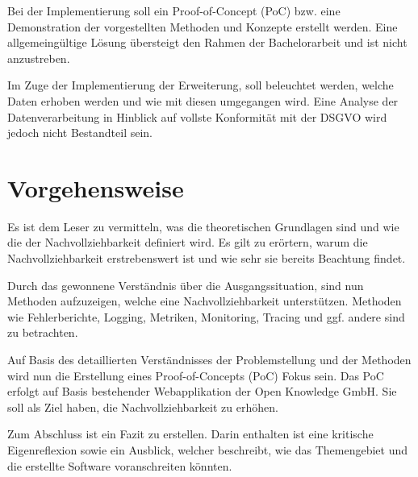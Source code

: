 Bei der Implementierung soll ein Proof-of-Concept (PoC) bzw. eine Demonstration der vorgestellten Methoden und Konzepte erstellt werden. Eine allgemeingültige Lösung übersteigt den Rahmen der Bachelorarbeit und ist nicht anzustreben.


Im Zuge der Implementierung der Erweiterung, soll beleuchtet werden, welche Daten erhoben werden und wie mit diesen umgegangen wird. Eine Analyse der Datenverarbeitung in Hinblick auf vollste Konformität mit der DSGVO wird jedoch nicht Bestandteil sein.

\pagebreak

\section{Vorgehensweise}

Es ist dem Leser zu vermitteln, was die theoretischen Grundlagen sind und wie die der Nachvollziehbarkeit definiert wird. Es gilt zu erörtern, warum die Nachvollziehbarkeit erstrebenswert ist und wie sehr sie bereits Beachtung findet.

Durch das gewonnene Verständnis über die Ausgangssituation, sind nun Methoden aufzuzeigen, welche eine Nachvollziehbarkeit unterstützen. Methoden wie Fehlerberichte, Logging, Metriken, Monitoring, Tracing und ggf. andere sind zu betrachten.

Auf Basis des detaillierten Verständnisses der Problemstellung und der Methoden wird nun die Erstellung eines Proof-of-Concepts (PoC) Fokus sein. Das PoC erfolgt auf Basis bestehender Webapplikation der Open Knowledge GmbH. Sie soll als Ziel haben, die Nachvollziehbarkeit zu erhöhen.

Zum Abschluss ist ein Fazit zu erstellen. Darin enthalten ist eine kritische Eigenreflexion sowie ein Ausblick, welcher beschreibt, wie das Themengebiet und die erstellte Software voranschreiten könnten.


